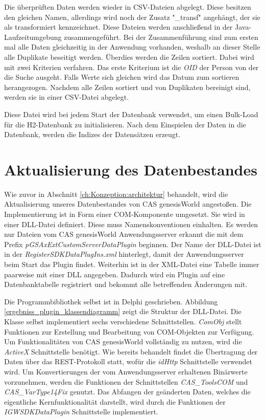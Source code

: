 Die überprüften Daten werden wieder in CSV-Dateien abgelegt. Diese besitzen den gleichen Namen, allerdings wird noch der Zusatz "\_transf" angehängt, der sie als transformiert kennzeichnet. Diese Dateien werden anschließend in der Java-Laufzeitumgebung zusammengeführt. Bei der Zusammenführung sind zum ersten mal alle Daten gleichzeitig in der Anwendung vorhanden, weshalb an dieser Stelle alle Duplikate beseitigt werden. Überdies werden die Zeilen sortiert. Dabei wird mit zwei Kriterien verfahren. Das erste Kriterium ist die \textit{OID} der Person von der die Suche ausgeht. Falls Werte sich gleichen wird das Datum zum sortieren herangezogen. Nachdem alle Zeilen sortiert und von Duplikaten bereinigt sind, werden sie in einer CSV-Datei abgelegt. 

Diese Datei wird bei jedem Start der Datenbank verwendet, um einen Bulk-Load für die H2-Datenbank zu initialisieren. Nach dem Einspielen der Daten in die Datenbank, werden die Indizes der Datensätzen erzeugt.

\section{Aktualisierung des Datenbestandes}

Wie zuvor in Abschnitt \ref{ch:Konzeption:architektur} behandelt, wird die Aktualisierung unseres Datenbestandes von CAS genesisWorld angestoßen. Die Implementierung ist in Form einer COM-Komponente umgesetzt. Sie wird in einer DLL-Datei definiert. Diese muss Namenskonventionen einhalten. Es werden nur Dateien vom CAS genesisWorld Anwendungsserver erkannt die mit dem Prefix \textit{pGSAxExtCustomServerDataPlugin} beginnen. Der Name der DLL-Datei ist in der \textit{RegisterSDKDataPlugIns.xml} hinterlegt, damit der Anwendungsserver beim Start das Plugin findet. Weiterhin ist in der XML-Datei eine Tabelle immer paarweise mit einer DLL angegeben. Dadurch wird ein Plugin auf eine Datenbanktabelle registriert und bekommt alle betreffenden Änderungen mit.

Die Programmbibliothek selbst ist in Delphi geschrieben. Abbildung \ref{ergebniss_plugin_klassendiagramm} zeigt die Struktur der DLL-Datei. Die Klasse selbst implementiert sechs verschiedene Schnittstellen. \textit{ComObj} stellt Funktionen zur Erstellung und Bearbeitung von COM-Objekten zur Verfügung. Um Funktionalitäten von CAS genesisWorld vollständig zu nutzen, wird die \textit{ActiveX} Schnittstelle benötigt. Wie bereits behandelt findet die Übertragung der Daten über das REST-Protokoll statt, wofür die \textit{idHttp} Schnittstelle verwendet wird. Um Konvertierungen der vom Anwendungsserver erhaltenen Binärwerte vorzunehmen, werden die Funktionen der Schnittstellen \textit{CAS\_ToolsCOM} und \textit{CAS\_VarType14Fix} genutzt. Das Abfangen der geänderten Daten, welches die eigentliche Kernfunktionalität darstellt, wird durch die Funktionen der \textit{IGWSDKDataPlugin} Schnittstelle implementiert.

